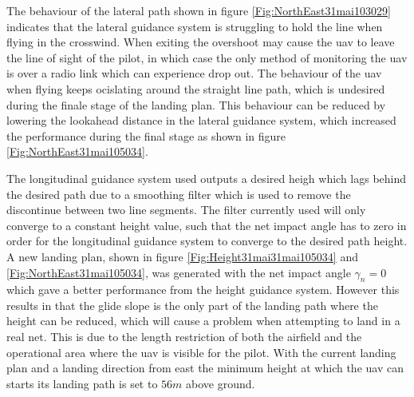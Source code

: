 The behaviour of the lateral path shown in figure \ref{Fig:NorthEast31mai103029} indicates that the lateral guidance system is struggling to hold the line when flying in the crosswind. When exiting the overshoot may cause the \gls{uav} to leave the line of sight of the pilot, in which case the only method of monitoring the \gls{uav} is over a radio link which can experience drop out. The behaviour of the \gls{uav} when flying keeps ocislating around the straight line path, which is undesired during the finale stage of the landing plan. This behaviour can be reduced by lowering the lookahead distance in the lateral guidance system, which increased the performance during the final stage as shown in figure \ref{Fig:NorthEast31mai105034}.  

The longitudinal guidance system used outputs a desired heigh which lags behind the desired path due to a smoothing filter which is used to remove the discontinue between two line segments. The filter currently used will only converge to a constant height value, such that the net impact angle has to zero in order for the longitudinal guidance system to converge to the desired path height. A new landing plan, shown in figure \ref{Fig:Height31mai31mai105034} and \ref{Fig:NorthEast31mai105034}, was generated with the net impact angle $\gamma_n = 0$ which gave a better performance from the height guidance system. However this results in that the glide slope is the only part of the landing path where the height can be reduced, which will cause a problem when attempting to land in a real net. This is due to the length restriction of both the airfield and the operational area where the \gls{uav} is visible for the pilot. With the current landing plan and a landing direction from east the minimum height at which the \gls{uav} can starts its landing path is set to $56 m$ above ground. 
\newpage

